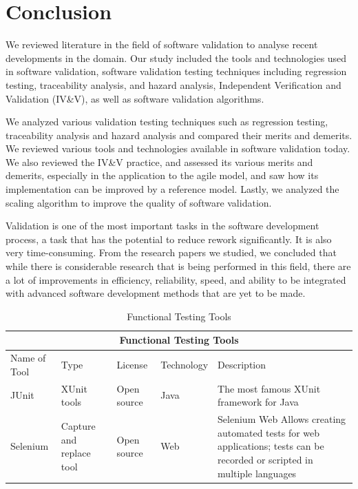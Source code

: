 \documentclass[journal, onecolumn]{IEEEtran}
\begin{document}
	\section{Conclusion}
	\bigskip
	
	We reviewed literature in the field of software validation to analyse recent developments in the domain. Our study included the tools and technologies used in software validation, software validation testing techniques including regression testing, traceability analysis, and hazard analysis, Independent Verification and Validation (IV\&V), as well as software validation algorithms.
	
	We analyzed various validation testing techniques such as regression testing, traceability analysis and hazard analysis and compared their merits and demerits. We reviewed various tools and technologies available in software validation today. We also reviewed the IV\&V practice, and assessed its various merits and demerits, especially in the application to the agile model, and saw how its implementation can be improved by a reference model. Lastly, we analyzed the scaling algorithm to improve the quality of software validation.
	
	
	Validation is one of the most important tasks in the software development process, a task that has the potential to reduce rework significantly. It is also very time-consuming. From the research papers we studied, we concluded that while there is considerable research that is being performed in this field, there are a lot of improvements in efficiency, reliability, speed, and ability to be integrated with advanced software development methods that are yet to be made.
	
	
	
	\pagebreak 
	\newpage
	
	
	

	\pagebreak
	\appendix
	
	\begin{table}[h]
		\centering
		\begin{tabular}{|p{1cm}||p{1.5cm}|p{1.5cm}|p{1.25cm}|p{3cm}|}
			
			\hline
			\multicolumn{5}{|c|}{Functional Testing Tools} \\
			\hline
			Name of Tool & Type & License & Technology &Description\\
			\hline
			JUnit  & XUnit tools  & Open source &Java&   The most famous XUnit framework for Java \\
			\hline
			Selenium & Capture and replace tool &  Open source  & Web   &Selenium Web Allows creating automated tests for web applications; tests can be recorded or scripted in multiple languages\\
			\hline
		\end{tabular}
		\caption{Functional Testing Tools}
	\end{table}
	
\end{document}
